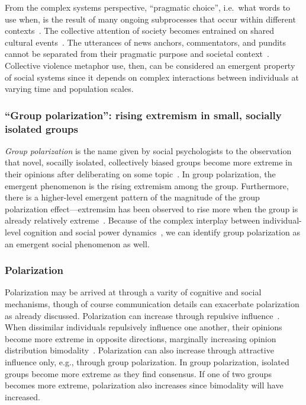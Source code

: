 \documentclass[12pt,letterpaper]{article}
\begin{document}
From the complex systems perspective, ``pragmatic choice'', i.e.\ what words
to use when, is the result of many ongoing subprocesses that occur within
different contexts~\cite{Gibbs2012a}. The collective attention of society becomes entrained on
shared cultural events~\cite{Fusaroli2015}. The utterances of news anchors, commentators, and 
pundits cannot be separated from their pragmatic purpose and societal context~\cite{Kovecses2010}.
Collective violence metaphor use, then, can be considered an emergent property of 
social systems since it depends on complex interactions between individuals
at varying time and population scales. 


\subsubsection{``Group polarization'': rising extremism in small, socially isolated groups}

\emph{Group polarization} is the name given by social psychologists to the observation
that novel, socailly isolated, collectively biased groups become more extreme
in their opinions after deliberating on some 
topic~\cite{Brown1986,Isenberg1986,Brown2000,Sunstein2002}.
In group polarization, the emergent phenomenon is the rising extremism among the group.
Furthermore, there is a higher-level emergent pattern of the magnitude of the group polarization
effect---extremsim has been observed to rise more when the group is already
relatively extreme~\cite{Myers1982}. Because of the complex interplay between individual-level
cognition and social power dynamics~\cite{Friedkin1999a}, we can identify group
polarization as an emergent social phenomenon as well. 

\subsubsection{Polarization}

Polarization may be arrived at through a varity of cognitive and social mechanisms, 
though of course communication details can exacerbate polarization as already discussed.
Polarization can increase through repulsive 
influence~\cite{Baldassarri2007,Flache2011,Bail2018,Turner2018}. When dissimilar
individuals repulsively influence one another, their opinions become more
extreme in opposite directions, marginally increasing opinion distribution
bimodality~\cite{Mas2013,Turner2020}. 
Polarization can also increase through attractive influence 
only, e.g., through group polarization.
In group polarization, isolated groups become more extreme as they find consensus. 
If one of two groups becomes more extreme, polarization also increases
since bimodality will have increased. 
\end{document}
